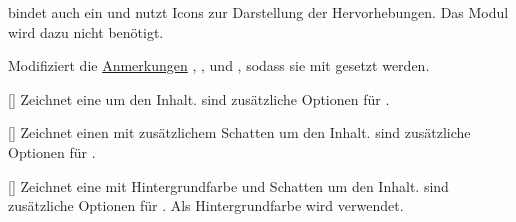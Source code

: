  bindet auch  ein und nutzt Icons zur Darstellung
der Hervorhebungen. Das Modul  wird dazu nicht benötigt.

\begin{options}
	Modifiziert die \hyperref[subsec:typo-anmerkungen]{Anmerkungen} , ,
	 und , sodass sie mit  gesetzt werden.

\end{options}

\begin{example}[add-silent-cmds={frage,aboptionen}]
\end{example}

\begin{environments}
	[]
	Zeichnet eine  um den Inhalt.  sind zusätzliche Optionen
	für .

	\begin{example}[add-silent-envs={rahmen}]
		\begin{rahmen}
			\blindtext
		\end{rahmen}
	\end{example}

	[]
	Zeichnet einen  mit zusätzlichem Schatten um den Inhalt. 
	sind zusätzliche Optionen für .

	\begin{example}[add-silent-envs={schattenbox}]
		\begin{schattenbox}
			\blindtext
		\end{schattenbox}
	\end{example}

	[]
	Zeichnet eine  mit Hintergrundfarbe und Schatten um den Inhalt. 
	sind zusätzliche Optionen für . Als Hintergrundfarbe wird 
	verwendet.

	\begin{example}[add-silent-envs={infobox}]
		\begin{infobox}
			\blindtext
		\end{infobox}
	\end{example}
\end{environments}

